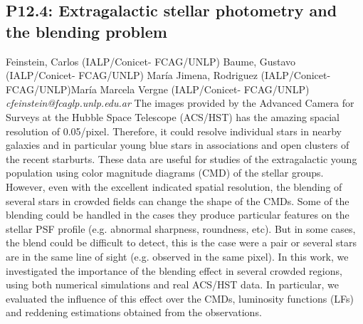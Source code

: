 \documentclass{report}
\begin{document}
\subsection*{P12.4: Extragalactic stellar photometry and the blending problem}
\bigskip
Feinstein, Carlos (IALP/Conicet- FCAG/UNLP) \newline Baume, Gustavo (IALP/Conicet- FCAG/UNLP) \newline  María Jimena, Rodriguez (IALP/Conicet- FCAG/UNLP)\newline  María Marcela Vergne (IALP/Conicet- FCAG/UNLP)\newline  \newline  \newline\newline
{\it cfeinstein@fcaglp.unlp.edu.ar}\newline
\newline\newline
The images provided by the Advanced Camera for Surveys at the Hubble Space Telescope (ACS/HST) has the amazing spacial  resolution of 0.05/pixel. Therefore, it could resolve  individual stars in nearby galaxies and in particular young blue stars in associations and open clusters of the recent starburts. These data are useful for studies of the extragalactic young  population  using color magnitude diagrams (CMD) of the stellar groups. However, even with the excellent indicated spatial resolution, the blending of several stars in crowded fields can change the shape of the CMDs. Some of the blending could be handled in the cases they produce  particular features on the stellar PSF profile (e.g. abnormal sharpness, roundness, etc). But in some cases, the blend could be difficult to detect, this is the case were a pair or several stars are in the same line of sight (e.g. observed in the same pixel).      
In this work, we investigated the importance of the blending effect in several crowded regions, using both numerical simulations and real ACS/HST data. In particular, we evaluated the influence of this effect over the CMDs, luminosity functions (LFs) and reddening estimations obtained from the observations.\newline
\newpage
\end{document}
